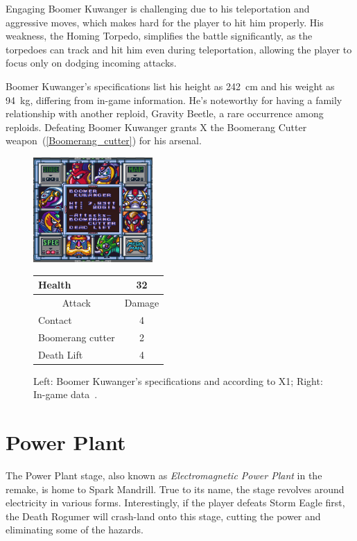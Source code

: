 Engaging Boomer Kuwanger is challenging due to his teleportation and aggressive moves, which makes hard for the player to hit him properly. His weakness, the Homing Torpedo, simplifies the battle significantly, as the torpedoes can track and hit him even during teleportation, allowing the player to focus only on dodging incoming attacks.

Boomer Kuwanger's specifications list his height as 242~cm and his weight as 94~kg, differing from in-game information. He's noteworthy for having a family relationship with another reploid, Gravity Beetle, a rare occurrence among reploids. Defeating Boomer Kuwanger grants X the Boomerang Cutter weapon~(\ref{Boomerang_cutter}) for his arsenal.
\begin{figure}[htp]
	\begin{minipage}[c]{0.45\linewidth}
		\vspace{0pt}
		\centering
		\includegraphics[height=4cm]{figures/X1/Boomer_kuwanger/Boomer_kuwanger_specs.png}
	\end{minipage}
	\begin{minipage}[c]{0.45\linewidth}
		\centering
		\vspace{0pt}
		\begin{tabular}[h]{l c}
			\toprule
			Health  & 32\\
			\midrule
			\multicolumn{1}{c}{Attack} & \multicolumn{1}{c}{Damage}\\
			Contact & 4\\
			Boomerang cutter& 2\\
			Death Lift & 4\\
			\bottomrule
		\end{tabular}
	\end{minipage}
	\caption{Left: Boomer Kuwanger's specifications and according to X1; Right: In-game data~\cite{wiki:Boomer_kuwanger,book:Compendium}. }
	\label{Kuwanger_specs}
\end{figure}




\section{Power Plant}
The Power Plant stage, also known as \textit{Electromagnetic Power Plant} in the remake, is home to Spark Mandrill. True to its name, the stage revolves around electricity in various forms. Interestingly, if the player defeats Storm Eagle first, the Death Rogumer will crash-land onto this stage, cutting the power and eliminating some of the hazards.

